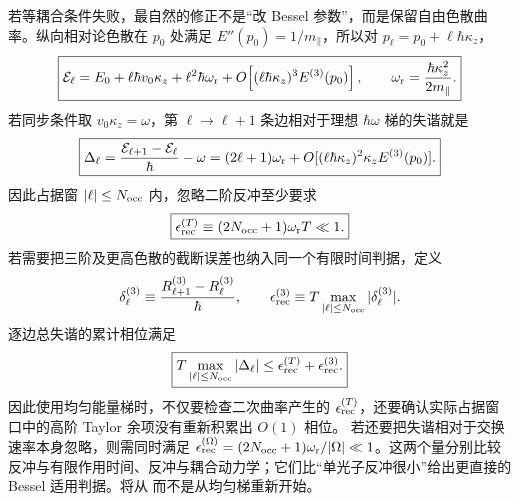 若等耦合条件失败，最自然的修正不是“改 Bessel 参数”，而是保留自由色散曲率。纵向相对论色散在 $p_0$ 处满足 $E''(p_0)=1/m_\parallel$，所以对 $p_\ell=p_0+\ell\hbar \kappa_z$，
\begin{equation}
\boxed{
\mathcal E_\ell
=E_0+\ell\hbar v_0\kappa_z
+\ell^2\hbar\omega_{\rm r}
+O\!\left[(\ell\hbar \kappa_z)^3E^{(3)}(p_0)\right],
\qquad
\omega_{\rm r}=\frac{\hbar \kappa_z^2}{2m_\parallel}.}
\label{eq:pinem_recoil_lattice_expansion}
\end{equation}
若同步条件取 $v_0\kappa_z=\omega$，第 $\ell\to\ell+1$ 条边相对于理想 $\hbar\omega$ 梯的失谐就是
\begin{equation}
\boxed{
\Delta_\ell
=\frac{\mathcal E_{\ell+1}-\mathcal E_\ell}{\hbar}-\omega
=(2\ell+1)\omega_{\rm r}+O[(\ell\hbar \kappa_z)^2\kappa_zE^{(3)}(p_0)].}
\label{eq:pinem_recoil_edge_detuning}
\end{equation}
因此占据窗 $|\ell|\le N_{\rm occ}$ 内，忽略二阶反冲至少要求
\begin{equation}
\boxed{
\epsilon_{\rm rec}^{(T)}
\equiv(2N_{\rm occ}+1)\omega_{\rm r}T\ll1.}
\label{eq:pinem_recoil_phase_condition}
\end{equation}
若需要把三阶及更高色散的截断误差也纳入同一个有限时间判据，定义
\[
\delta_\ell^{(3)}\equiv
\frac{R_{\ell+1}^{(3)}-R_\ell^{(3)}}{\hbar},
\qquad
\epsilon_{\rm rec}^{(3)}\equiv
T\max_{|\ell|\le N_{\rm occ}}|\delta_\ell^{(3)}|.
\]
逐边总失谐的累计相位满足
\begin{equation}
\boxed{
T\max_{|\ell|\le N_{\rm occ}}|\Delta_\ell|
\le
\epsilon_{\rm rec}^{(T)}+\epsilon_{\rm rec}^{(3)}.}
\label{eq:pinem_recoil_total_phase_bound}
\end{equation}
因此使用均匀能量梯时，不仅要检查二次曲率产生的 $\epsilon_{\rm rec}^{(T)}$，还要确认实际占据窗口中的高阶 Taylor 余项没有重新积累出 $O(1)$ 相位。
若还要把失谐相对于交换速率本身忽略，则需同时满足 $\epsilon_{\rm rec}^{(\Omega)}=(2N_{\rm occ}+1)\omega_{\rm r}/|\Omega|\ll1$。这两个量分别比较反冲与有限作用时间、反冲与耦合动力学；它们比“单光子反冲很小”给出更直接的 Bessel 适用判据。将从 而不是从均匀梯重新开始。

